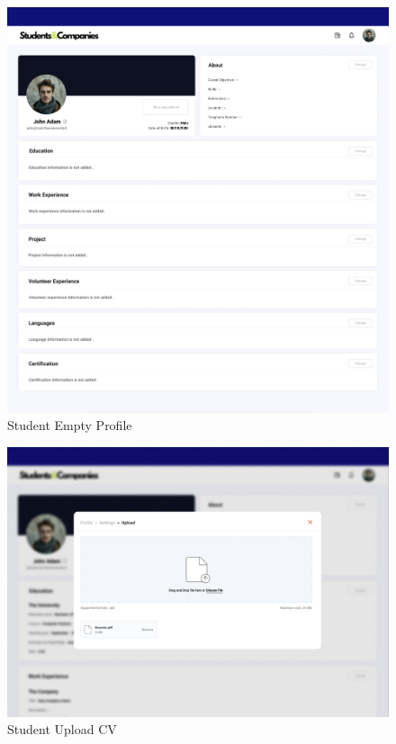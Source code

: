 \documentclass{article}
\begin{document}
\begin{figure}[H]
    \centering
    \includegraphics[scale = 0.35
    ]{figures/UserInterfaces/Student/Empty Profile.png}
    \caption{Student Empty Profile}
     \centering
\end{figure}
\begin{figure}[H]
    \centering
    \includegraphics[scale = 0.35
    ]{figures/UserInterfaces/Student/UploadCv.png}
    \caption{Student Upload CV}
     \centering
\end{figure}
\end{document}
